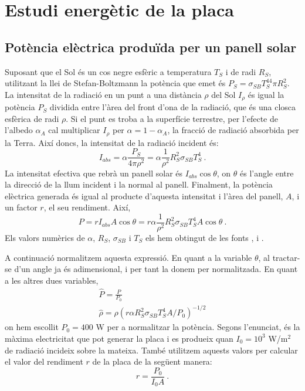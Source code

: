 \documentclass[11pt]{article}
\begin{document}
\section{Estudi energètic de la placa}
\subsection{Potència elèctrica produïda per un panell solar}
Suposant que el Sol és un cos negre esfèric a temperatura $T_S$ i de radi $R_S$, utilitzant la llei de Stefan-Boltzmann la potència que emet és $P_S=\sigma_{SB}T_S^44\pi R_S^2$. La intensitat de la radiació en un punt a una distància ${\rho}$ del Sol $I_{\rho}$ és igual la potència $P_S$ dividida entre l'àrea del front d'ona de la radiació, que és una closca esfèrica de radi ${\rho}$. Si el punt es troba a la superfície terrestre,  per l’efecte de l’albedo $\alpha_A$ cal multiplicar $I_{\rho}$ per $\alpha=1-\alpha_A$, la fracció de radiació absorbida per la Terra. Així doncs, la intensitat de la radiació incident és:
\begin{equation}
    I_{abs} = \alpha \frac{P_S}{4\pi \rho^2}=\alpha \frac{1}{\rho^2} R_S^2\sigma_{SB} T_S^4 \ .
    \label{I_abs}
\end{equation}
La intensitat efectiva que rebrà un panell solar és $I_{abs} \cos{\theta}$, on $\theta$ és l'angle entre la direcció de la llum incident i la normal al panell. Finalment, la potència elèctrica generada és igual al producte d'aquesta intensitat i l'àrea del panell, $A$, i un factor $r$, el seu rendiment. Així,
\begin{equation}
    P = r I_{abs} A \cos{\theta} = r \alpha \frac{1}{\rho^2}R_S^2\sigma_{SB}T_S^4A \cos{\theta} \ .
    \label{potencia placa}
\end{equation}
Els valors numèrics de $\alpha$, $R_S$, $\sigma_{SB}$ i $T_S$ els hem obtingut de les fonts \cite{Earth}, \cite{Sun} i \cite{Universe}.

A continuació normalitzem aquesta expressió. En quant a la variable $\theta$, al tractar-se d'un angle ja és adimensional, i per tant la donem per normalitzada. En quant a les altres dues variables,
\begin{align}
    \hat{P}=\frac{P}{P_0} \label{P normalizada} \\
    \hat{\rho}= \rho \left( r \alpha R_S^2\sigma_{SB}T_S^4A/P_0 \right)^{-1/2} \label{rho normalizada}
\end{align}
on hem escollit $P_0=400$ W per a normalitzar la potència. Segons l'enunciat, és la màxima electricitat que pot generar la placa i es produeix quan $I_0=10^3$ W/$\text{m}^2$ de radiació incideix sobre la mateixa. També utilitzem aquests valors per calcular el valor del rendiment $r$ de la placa de la següent manera:
\begin{equation}
     r = \frac{P_0}{I_0A} \ .
\end{equation}
\end{document}
